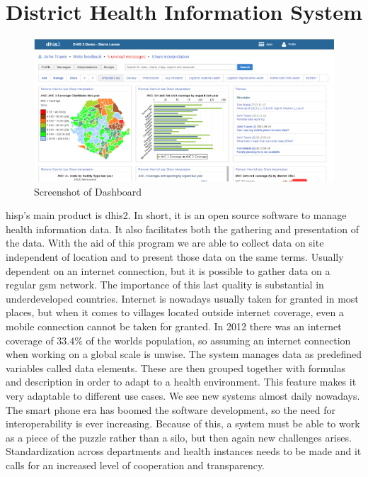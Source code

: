 \cite{strategyhisp:uio}
\cite{networkhisp:uio}
\cite{jbemss:noa}

\section{District Health Information System}
\begin{figure}
\centering
\includegraphics[width=\textwidth]{context/img/dhis2Dash}
\caption{Screenshot of Dashboard}
\label{fig:dash}
\end{figure}
\gls{hisp}'s main product is \gls{dhis2}. 
In short, it is an open source software to manage health information data. 
It also facilitates both the gathering and presentation of the data. 
With the aid of this program we are able to collect data on site independent of location and to present those data on the same terms. 
Usually dependent on an internet connection, but it is possible to gather data on a regular \gls{gsm} network. 
The importance of this last quality is substantial in underdeveloped countries. 
Internet is nowadays usually taken for granted in most places, but when it comes to villages located outside internet coverage, even a mobile connection cannot be taken for granted. 
In 2012 there was an internet coverage of $33.4\%$ of the worlds population, so assuming an internet connection when working on a global scale is unwise. 
The system manages data as predefined variables called data elements. 
These are then grouped together with formulas and description in order to adapt to a health environment. 
This feature makes it very adaptable to different use cases. 
We see new systems almost daily nowadays. 
The smart phone era has boomed the software development, so the need for interoperability is ever increasing. 
Because of this, a system must be able to work as a piece of the puzzle rather than a silo, but then again new challenges arises. 
Standardization across departments and health instances needs to be made and it calls for an increased level of cooperation and transparency.

